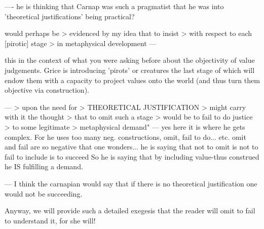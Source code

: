 \documentclass[10pt,titlepage]{book}
\begin{document}
 
----
he is thinking that Carnap was such a pragmatist that he was into  
'theoretical justifications' being practical?
 

would  perhaps  be
> evidenced by my idea that to insist
> with  respect to each [pirotic]  stage
> in metaphysical  development
---
 
this in the context of what you were asking
before about the objectivity of
value judgements. Grice is introducing
'pirots' or creatures the last
stage of which will endow them
with a capacity to project
values onto the world
(and thus turn them objective
via construction).
 
 
---
> upon the need for
> THEORETICAL   JUSTIFICATION
> might carry with it the thought
> that to omit  such a  stage
> would be to fail to do justice
> to some  legitimate
> metaphysical  demand"
  --- yes here it is where he gets complex. For he uses
  too many neg. constructions,
   omit, fail to do... etc.
  omit and fail are so negative that one wonders...
    he is saying that not to omit is not to fail
            to  include is to succeed
 So he is saying that by including value-thus construed
      he IS fulfilling a demand.
 
--- I think the carnapian would say
  that if there is no theoretical justification
 one would not be succeeding.

Anyway, we will provide such a detailed exegesis that the reader will  omit 
to fail to understand it, for she will!

\backmatter

%




\label{index}
\twocolumn[]
{\small\printindex}
\end{document}
